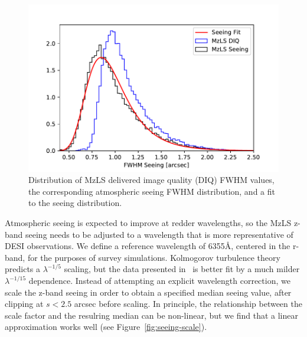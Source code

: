 \documentclass[12pt]{article}
\providecommand{\fig}[1]{Figure~\ref{fig:#1}}
\begin{document}
\begin{figure}[htb]
\begin{center}
\includegraphics[width=5in]{seeing-fit}
\caption{Distribution of MzLS delivered image quality (DIQ) FWHM values, the corresponding atmospheric seeing FWHM distribution, and a fit to the seeing distribution.}
\label{fig:seeing-fit}
\end{center}
\end{figure}

Atmospheric seeing is expected to improve at redder wavelengths, so the MzLS z-band seeing needs to be adjusted to a wavelength that is more representative of DESI observations.  We define a reference wavelength of 6355\AA, centered in the r-band, for the purposes of survey simulations. Kolmogorov turbulence theory predicts a $\lambda^{-1/5}$ scaling, but the data presented in~\cite{2014PASP..126..296D} is better fit by a much milder $\lambda^{-1/15}$ dependence. Instead of attempting an explicit wavelength correction, we scale the z-band seeing in order to obtain a specified median seeing value, after clipping at $s < 2.5$ arcsec before scaling. In principle, the relationship between the scale factor and the resulring median can be non-linear, but we find that a linear approximation works well (see \fig{seeing-scale}).
\end{document}
